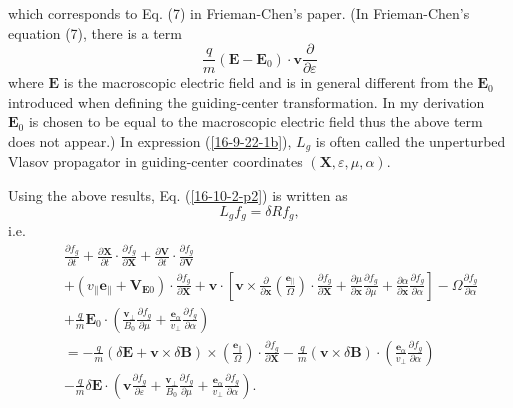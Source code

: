 \documentclass{article}
\newcommand{\tmmathbf}[1]{\ensuremath{\boldsymbol{#1}}}
\begin{document}
which corresponds to Eq. (7) in Frieman-Chen's paper{\cite{frieman1982}}. (In
Frieman-Chen's equation (7), there is a term
\[ \frac{q}{m} (\mathbf{E}-\mathbf{E}_0) \cdot \mathbf{v}
   \frac{\partial}{\partial \varepsilon} \]
where $\mathbf{E}$ is the macroscopic electric field and is in general
different from the $\mathbf{E}_0$ introduced when defining the guiding-center
transformation. In my derivation \ $\mathbf{E}_0$ is chosen to be equal to the
macroscopic electric field thus the above term does not appear.) In expression
(\ref{16-9-22-1b}), $L_g$ is often called the unperturbed Vlasov propagator in
guiding-center coordinates $(\mathbf{X}, \varepsilon, \mu, \alpha)$.

Using the above results, Eq. (\ref{16-10-2-p2}) is written as
\begin{equation}
  \label{16-9-22-p1} L_g f_g = \delta R f_g,
\end{equation}
i.e.
\begin{eqnarray}
  &  & \frac{\partial f_g}{\partial t} + \frac{\partial \mathbf{X}}{\partial
  t} \cdot \frac{\partial f_g}{\partial \mathbf{X}} + \frac{\partial
  \mathbf{V}}{\partial t} \cdot \frac{\partial f_g}{\partial \mathbf{V}}
  \nonumber\\
  &  & + (v_{\parallel} \mathbf{e}_{\parallel} +\mathbf{V}_{\mathbf{E}0})
  \cdot \frac{\partial f_g}{\partial \mathbf{X}} +\mathbf{v} \cdot \left[
  \mathbf{v} \times \frac{\partial}{\partial \mathbf{x}} \left(
  \frac{\tmmathbf{e}_{\parallel}}{\Omega} \right) \cdot \frac{\partial
  f_g}{\partial \tmmathbf{X}} + \frac{\partial \mu}{\partial \mathbf{x}} 
  \frac{\partial f_g}{\partial \mu} + \frac{\partial \alpha}{\partial
  \mathbf{x}}  \frac{\partial f_g}{\partial \alpha} \right] - \Omega
  \frac{\partial f_g}{\partial \alpha} \nonumber\\
  &  & + \frac{q}{m} \mathbf{E}_0 \cdot \left( \frac{\mathbf{v}_{\perp}}{B_0}
  \frac{\partial f_g}{\partial \mu} + \frac{\tmmathbf{e}_{\alpha}}{v_{\perp}}
  \frac{\partial f_g}{\partial \alpha} \right) \nonumber\\
  &  & = - \frac{q}{m} (\delta \mathbf{E}+\mathbf{v} \times \delta
  \mathbf{B}) \times \left( \frac{\tmmathbf{e}_{\parallel}}{\Omega}  \right)
  \cdot \frac{\partial f_g}{\partial \mathbf{X}} - \frac{q}{m} (\mathbf{v}
  \times \delta \mathbf{B}) \cdot \left(
  \frac{\tmmathbf{e}_{\alpha}}{v_{\perp}}  \frac{\partial f_g}{\partial
  \alpha} \right) \nonumber\\
  &  & - \frac{q}{m} \delta \mathbf{E} \cdot \left( \mathbf{v} \frac{\partial
  f_g}{\partial \varepsilon} + \frac{\mathbf{v}_{\perp}}{B_0}  \frac{\partial
  f_g}{\partial \mu} + \frac{\tmmathbf{e}_{\alpha}}{v_{\perp}}  \frac{\partial
  f_g}{\partial \alpha} \right) .  \label{18-12-16-1}
\end{eqnarray}
\end{document}
